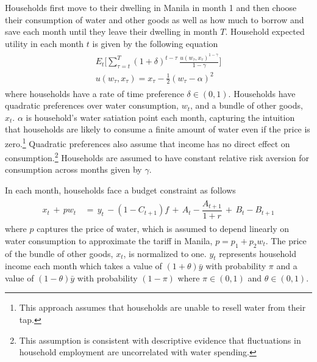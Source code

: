 \documentclass[12pt,table]{article}
\begin{document}
Households first move to their dwelling in Manila in month 1 and then choose their consumption of water and other goods as well as how much to borrow and save each month until they leave their dwelling in month $T$.  Household expected utility in each month $t$ is given by the following equation
\begin{align}\label{eq:u}
\begin{split}
E_t \Big[ \sum_{\tau = t}^{T} (1+\delta)^{t-\tau} \,\frac{u(w_{\tau},x_{\tau})^{1-\gamma}}{1-\gamma}   \Big]\\
u(w_{\tau},x_{\tau}) =  x_{\tau} -  \frac{1}{2} (w_{\tau} - \alpha)^2
\end{split} 
\end{align}
where households have a rate of time preference $\delta \in (0,1)$.  Households have quadratic preferences over water consumption, $w_{t}$, and a bundle of other goods, $x_{t}$.  $\alpha$ is household's water satiation point each month, capturing the intuition that households are likely to consume a finite amount of water even if the price is zero.\footnote{This approach assumes that households are unable to resell water from their tap.}  Quadratic preferences also assume that income has no direct effect on consumption.\footnote{This assumption is consistent with descriptive evidence that fluctuations in household employment are uncorrelated with water spending.}  Households are assumed to have constant relative risk aversion for consumption across months given by $\gamma$.


In each month, households face a budget constraint as follows
\begin{align}\label{eq:bc}
\begin{split}
x_t \, + \, p w_t \, &= \, y_t \, - (1-C_{t+1})f  \, + \,  A_t  - \dfrac{A_{t+1}}{1+r}   \, + \,  B_t - B_{t+1} 
\end{split}
\end{align}
where $p$ captures the price of water, which is assumed to depend linearly on water consumption to approximate the tariff in Manila, $p=p_1+p_2w_t$.   The price of the bundle of other goods, $x_t$, is normalized to one.  $y_t$ represents household income each month which takes a value of $(1+\theta)\bar{y}$ with probability $\pi$ and a value of $(1-\theta)\bar{y}$ with probability $(1-\pi)$ where $\pi \in (0,1)$ and $\theta  \in (0,1)$.  
\end{document}
